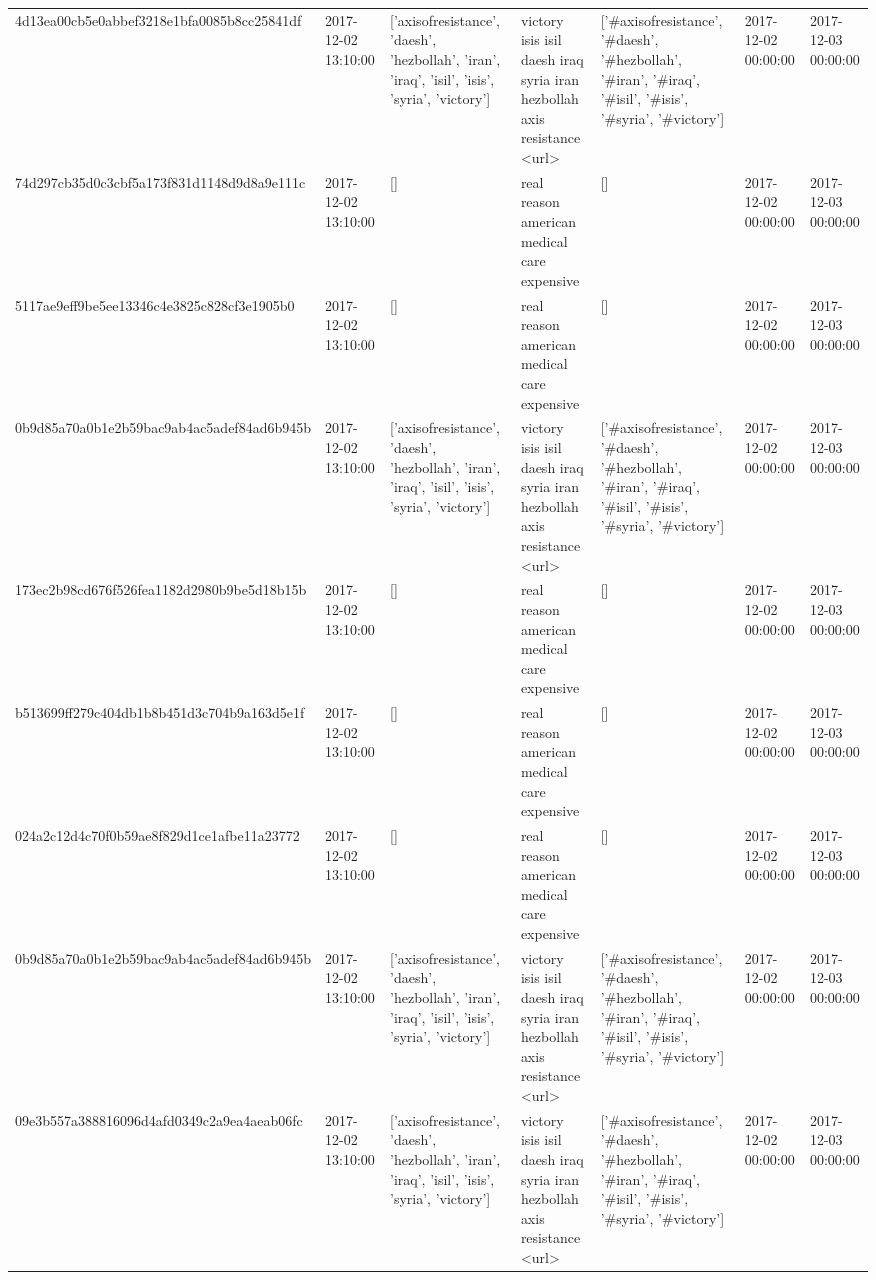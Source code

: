 \begin{tabular}{lllllll}
4d13ea00cb5e0abbef3218e1bfa0085b8cc25841df & 2017-12-02 13:10:00 & ['axisofresistance', 'daesh', 'hezbollah', 'iran', 'iraq', 'isil', 'isis', 'syria', 'victory'] & victory isis isil daesh iraq syria iran hezbollah axis resistance <url> & ['#axisofresistance', '#daesh', '#hezbollah', '#iran', '#iraq', '#isil', '#isis', '#syria', '#victory'] & 2017-12-02 00:00:00 & 2017-12-03 00:00:00 \\
74d297cb35d0c3cbf5a173f831d1148d9d8a9e111c & 2017-12-02 13:10:00 & [] & real reason american medical care expensive & [] & 2017-12-02 00:00:00 & 2017-12-03 00:00:00 \\
5117ae9eff9be5ee13346c4e3825c828cf3e1905b0 & 2017-12-02 13:10:00 & [] & real reason american medical care expensive & [] & 2017-12-02 00:00:00 & 2017-12-03 00:00:00 \\
0b9d85a70a0b1e2b59bac9ab4ac5adef84ad6b945b & 2017-12-02 13:10:00 & ['axisofresistance', 'daesh', 'hezbollah', 'iran', 'iraq', 'isil', 'isis', 'syria', 'victory'] & victory isis isil daesh iraq syria iran hezbollah axis resistance <url> & ['#axisofresistance', '#daesh', '#hezbollah', '#iran', '#iraq', '#isil', '#isis', '#syria', '#victory'] & 2017-12-02 00:00:00 & 2017-12-03 00:00:00 \\
173ec2b98cd676f526fea1182d2980b9be5d18b15b & 2017-12-02 13:10:00 & [] & real reason american medical care expensive & [] & 2017-12-02 00:00:00 & 2017-12-03 00:00:00 \\
b513699ff279c404db1b8b451d3c704b9a163d5e1f & 2017-12-02 13:10:00 & [] & real reason american medical care expensive & [] & 2017-12-02 00:00:00 & 2017-12-03 00:00:00 \\
024a2c12d4c70f0b59ae8f829d1ce1afbe11a23772 & 2017-12-02 13:10:00 & [] & real reason american medical care expensive & [] & 2017-12-02 00:00:00 & 2017-12-03 00:00:00 \\
0b9d85a70a0b1e2b59bac9ab4ac5adef84ad6b945b & 2017-12-02 13:10:00 & ['axisofresistance', 'daesh', 'hezbollah', 'iran', 'iraq', 'isil', 'isis', 'syria', 'victory'] & victory isis isil daesh iraq syria iran hezbollah axis resistance <url> & ['#axisofresistance', '#daesh', '#hezbollah', '#iran', '#iraq', '#isil', '#isis', '#syria', '#victory'] & 2017-12-02 00:00:00 & 2017-12-03 00:00:00 \\
09e3b557a388816096d4afd0349c2a9ea4aeab06fc & 2017-12-02 13:10:00 & ['axisofresistance', 'daesh', 'hezbollah', 'iran', 'iraq', 'isil', 'isis', 'syria', 'victory'] & victory isis isil daesh iraq syria iran hezbollah axis resistance <url> & ['#axisofresistance', '#daesh', '#hezbollah', '#iran', '#iraq', '#isil', '#isis', '#syria', '#victory'] & 2017-12-02 00:00:00 & 2017-12-03 00:00:00 \\

\end{tabular}
